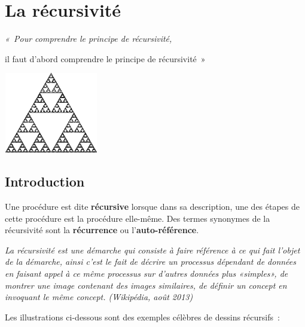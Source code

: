 \chapter{La récursivité}

\begin{center}
	{\itshape «~Pour comprendre le principe de récursivité, 
	
	il faut d'abord comprendre le principe de récursivité~»}

	\includegraphics[width=4.094cm,height=3.519cm]{image/a2012Logique2eme-img015.png}
\end{center}
	

\section{Introduction}
	
	Une procédure est dite \textbf{récursive} lorsque dans sa description, 
	une des étapes de cette procédure est la procédure elle-même. 
	Des termes synonymes de la récursivité sont la \textbf{récurrence} 
	ou l'\textbf{auto-référence}.
	
	\textit{La récursivité est une démarche qui consiste à faire 
	référence à ce qui fait l'objet de la démarche, ainsi c'est
	le fait de décrire un processus dépendant de données en faisant 
	appel à ce même processus sur d'autres données plus
	«simples», de montrer une image contenant des images similaires, 
	de définir un concept en invoquant le même concept.
	(Wikipédia, août 2013)}

	Les illustrations ci-dessous sont des exemples célèbres 
	de dessins récursifs~:

